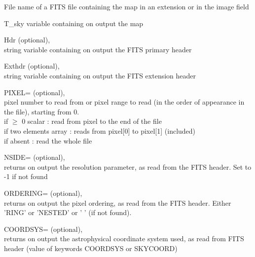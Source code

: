 \begin{qualifiers}
  \begin{qulist}{} %
 	\item[{File}]   
          name of a FITS file containing 
               the \healpix map in an extension or in the image field 

 	\item[{T\_sky}]  
	variable containing on output the \healpix map

       \item[{Hdr}] 
		  (optional), \\
		string variable containing on output
		  the FITS primary header

       \item[{Exthdr}] 
		  (optional), \\
		string variable containing on output
		  the FITS extension header

  	\item[{PIXEL=}]  
		(optional), \\
               pixel number to read from or pixel range to read
                 (in the order of appearance in the file), starting from 0. \\
               if $\ge$ 0 scalar        : read from pixel to the end of the file \\
               if two elements array : reads from pixel[0] to pixel[1]
		(included) \\
               if absent             : read the whole file

	 \item[{NSIDE=}] 
		(optional), \\
	        returns on output the \healpix resolution parameter, as read
		from the FITS header. Set to -1 if not found

	 \item[{ORDERING=}] 
	        (optional), \\
	        returns on output the pixel ordering, as read from the FITS
	        header. Either 'RING' or 'NESTED' or ' ' (if not found).

	 \item[{COORDSYS=}] 
	        (optional), \\
	        returns on output the astrophysical coordinate system used, 
		as read from FITS header (value of keywords COORDSYS or SKYCOORD)


\end{qulist}
\end{qualifiers}
